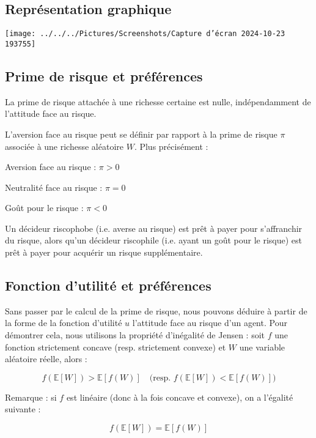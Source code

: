 \documentclass[a4paper, 12pt]{report}
\begin{document}
\subsection{Représentation graphique}

\begin{center}
	\texttt{[image: ../../../Pictures/Screenshots/Capture d'écran 2024-10-23 193755]}
\end{center}

\subsection{Prime de risque et préférences}

La prime de risque attachée à une richesse certaine est nulle, indépendamment de l'attitude face au risque.

L'aversion face au risque peut se définir par rapport à la prime de risque \( \pi \) associée à une richesse aléatoire \( W \). Plus précisément :

Aversion face au risque : \( \pi > 0 \)

Neutralité face au risque : \( \pi = 0 \)

Goût pour le risque : \( \pi < 0 \)

\noindent
Un décideur riscophobe (i.e. averse au risque) est prêt à payer pour s'affranchir du risque, alors qu'un décideur riscophile (i.e. ayant un goût pour le risque) est prêt à payer pour acquérir un risque supplémentaire.

\subsection{Fonction d'utilité et préférences}

Sans passer par le calcul de la prime de risque, nous pouvons déduire à partir de la forme de la fonction d'utilité \( u \) l'attitude face au risque d'un agent. Pour démontrer cela, nous utilisons la propriété d'inégalité de Jensen : soit \( f \) une fonction strictement concave (resp. strictement convexe) et \( W \) une variable aléatoire réelle, alors :

\[
f \left( \mathbb{E}[W] \right) > \mathbb{E}\left[ f(W) \right] \quad \text{(resp. } f \left( \mathbb{E}[W] \right) < \mathbb{E}\left[ f(W) \right] \text{)}
\]

Remarque : si \( f \) est linéaire (donc à la fois concave et convexe), on a l'égalité suivante :

\[
f \left( \mathbb{E}[W] \right) = \mathbb{E}\left[ f(W) \right]
\]
\end{document}
